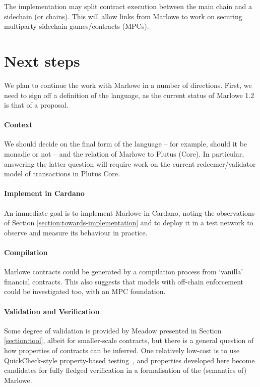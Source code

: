\documentclass[runningheads]{llncs}
\begin{document}
The implementation may split contract execution between the main chain and a sidechain (or chains). This will allow 
links from Marlowe to work on securing multiparty sidechain games/contracts (MPCs).


\section{Next steps}
\label{section:next-steps}

We plan to continue the work with Marlowe in a number of directions. First, we need to sign off a definition of the 
language, as the current status of Marlowe 1.2 is that of a proposal.

\paragraph{Context}

We should decide on the final form of the language -- for example, should it be monadic or not -- and the relation of 
Marlowe to Plutus (Core). In particular, answering the latter question will require work on the current 
redeemer/validator model of transactions in Plutus Core.

\paragraph{Implement in Cardano}

An immediate goal is to implement Marlowe in Cardano, noting the observations of Section 
\ref{section:towards-implementation} and to deploy it in a test network to observe and measure its behaviour in 
practice.

\paragraph{Compilation}

Marlowe contracts could be generated by a compilation process from `vanilla' financial contracts. This also suggests 
that models with off-chain enforcement could be investigated too, with an MPC foundation.

\paragraph{Validation and Verification}

Some degree of validation is provided by Meadow presented in Section \ref{section:tool}, albeit for smaller-scale 
contracts, but there is a general question of how properties of contracts can be inferred. One relatively low-cost is to 
use QuickCheck-style property-based testing~\cite{quickCheck}, and properties developed here become candidates for 
fully fledged verification in a formalisation of the (semantics of) Marlowe.
\end{document}
